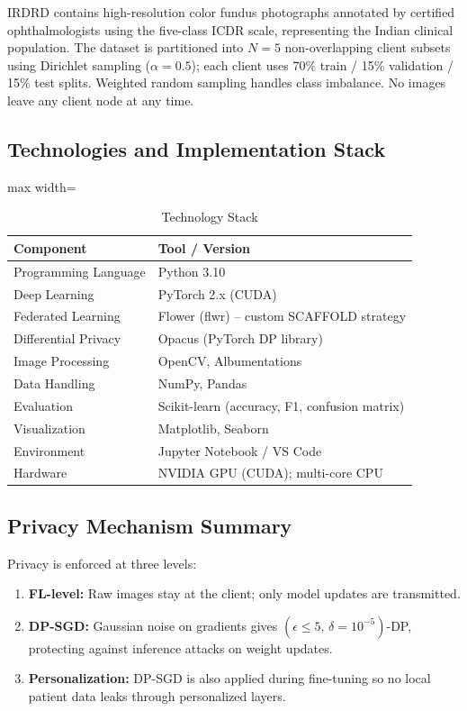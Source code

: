\documentclass[10pt, conference]{IEEEtran}
\begin{document}
IRDRD contains high-resolution color fundus photographs annotated by certified
ophthalmologists using the five-class ICDR scale, representing the Indian
clinical population. The dataset is partitioned into $N=5$ non-overlapping
client subsets using Dirichlet sampling ($\alpha=0.5$); each client uses 70\%
train / 15\% validation / 15\% test splits. Weighted random sampling handles
class imbalance. No images leave any client node at any time.

\subsection{Technologies and Implementation Stack}

\begin{table}[!htbp]
\centering
\caption{Technology Stack}
\label{tab:techstack}
\scriptsize
\begin{adjustbox}{max width=\columnwidth}
\begin{tabular}{ll}
\toprule
\textbf{Component} & \textbf{Tool / Version} \\
\midrule
Programming Language  & Python 3.10 \\
Deep Learning         & PyTorch 2.x (CUDA) \\
Federated Learning    & Flower (flwr) -- custom SCAFFOLD strategy \\
Differential Privacy  & Opacus (PyTorch DP library) \\
Image Processing      & OpenCV, Albumentations \\
Data Handling         & NumPy, Pandas \\
Evaluation            & Scikit-learn (accuracy, F1, confusion matrix) \\
Visualization         & Matplotlib, Seaborn \\
Environment           & Jupyter Notebook / VS Code \\
Hardware              & NVIDIA GPU (CUDA); multi-core CPU \\
\bottomrule
\end{tabular}
\end{adjustbox}
\end{table}

\subsection{Privacy Mechanism Summary}

Privacy is enforced at three levels:
\begin{enumerate}[leftmargin=*, itemsep=1pt]
  \item \textbf{FL-level:} Raw images stay at the client; only model updates are
        transmitted.
  \item \textbf{DP-SGD:} Gaussian noise on gradients gives
        $(\epsilon\leq5,\,\delta=10^{-5})$-DP, protecting against inference
        attacks on weight updates.
  \item \textbf{Personalization:} DP-SGD is also applied during fine-tuning so
        no local patient data leaks through personalized layers.
\end{enumerate}
\end{document}
